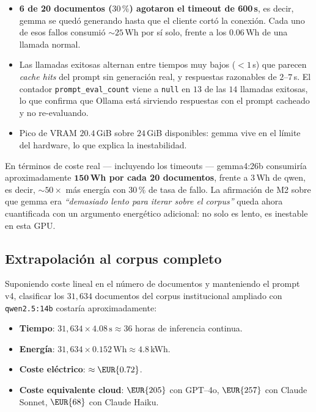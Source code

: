\begin{itemize}
  \item \textbf{6 de 20 documentos ($30\,\%$) agotaron el timeout de
        600\,s}, es decir, gemma se quedó generando hasta que el cliente
        cortó la conexión. Cada uno de esos fallos consumió
        $\sim 25$\,Wh por sí solo, frente a los $0.06$\,Wh de una llamada
        normal.
  \item Las llamadas exitosas alternan entre tiempos muy bajos
        ($<1$\,s) que parecen \emph{cache hits} del prompt sin generación
        real, y respuestas razonables de $2$--$7$\,s. El contador
        \texttt{prompt\_eval\_count} viene a \texttt{null} en $13$ de las
        $14$ llamadas exitosas, lo que confirma que Ollama está sirviendo
        respuestas con el prompt cacheado y no re-evaluando.
  \item Pico de VRAM $20.4$\,GiB sobre $24$\,GiB disponibles: gemma vive
        en el límite del hardware, lo que explica la inestabilidad.
\end{itemize}

En términos de coste real --- incluyendo los timeouts --- gemma4:26b
consumiría aproximadamente $\mathbf{150}$\,\textbf{Wh por cada 20
documentos}, frente a $3$\,Wh de qwen, es decir, $\sim 50\times$ más
energía con $30\,\%$ de tasa de fallo. La afirmación de M2 sobre que
gemma era \emph{``demasiado lento para iterar sobre el corpus''} queda
ahora cuantificada con un argumento energético adicional: no solo es
lento, es inestable en esta GPU.

\subsection{Extrapolación al corpus completo}

Suponiendo coste lineal en el número de documentos y manteniendo el
prompt v4, clasificar los $31{,}634$ documentos del corpus institucional
ampliado con \texttt{qwen2.5:14b} costaría aproximadamente:

\begin{itemize}
  \item \textbf{Tiempo}: $31{,}634 \times 4.08\,\text{s} \approx 36$ horas
        de inferencia continua.
  \item \textbf{Energía}: $31{,}634 \times 0.152\,\text{Wh} \approx 4.8$\,kWh.
  \item \textbf{Coste eléctrico}: $\approx \EUR{0.72}$.
  \item \textbf{Coste equivalente cloud}: $\EUR{205}$ con GPT--4o,
        $\EUR{257}$ con Claude Sonnet, $\EUR{68}$ con Claude Haiku.
\end{itemize}

